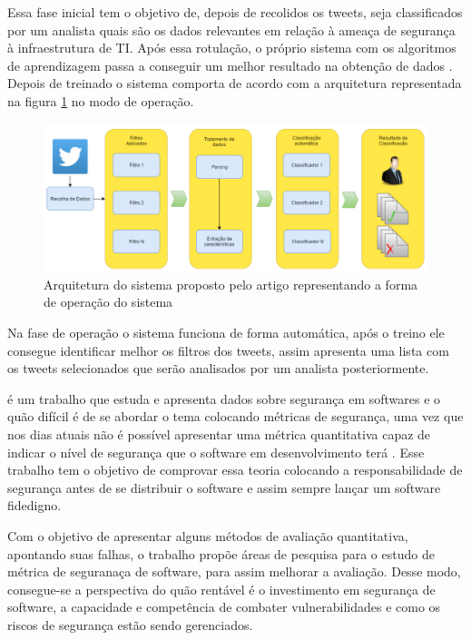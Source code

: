 Essa fase inicial tem o objetivo de, depois de recolidos os tweets, seja classificados por um analista quais são os dados relevantes em relação à ameaça de segurança à infraestrutura de TI. Após essa rotulação, o próprio sistema com os algoritmos de aprendizagem passa a conseguir um melhor resultado na obtenção de dados \cite{Correia2016}. Depois de treinado o sistema comporta de acordo com a arquitetura representada na figura \ref{fig:Correia2} no modo de operação.

\begin{figure}[H]
\centering
\includegraphics[width=1\textwidth]{imagens/Correia2.png}
\caption{Arquitetura do sistema proposto pelo artigo  representando a forma de operação do sistema}
\label{fig:Correia2}
\end{figure}

Na fase de operação o sistema funciona de forma automática, após o treino ele consegue identificar melhor os filtros dos tweets, assim apresenta uma lista com os tweets selecionados que serão analisados por um analista posteriormente.

 é um trabalho que estuda e apresenta dados sobre segurança em softwares e o quão difícil é de se abordar o tema colocando métricas de segurança, uma vez que nos dias atuais não é possível apresentar uma métrica quantitativa capaz de indicar o nível de segurança que o software em desenvolvimento terá \cite{ALVESBATISTA2007}. Esse trabalho tem o objetivo de comprovar essa teoria colocando a responsabilidade de segurança antes de se distribuir o software e assim sempre lançar um software fidedigno.

Com o objetivo de apresentar alguns métodos de avaliação quantitativa, apontando suas falhas, o trabalho propõe áreas de pesquisa para o estudo de métrica de seguranaça de software, para assim melhorar a avaliação. Desse modo, consegue-se a perspectiva do quão rentável é o investimento em segurança de software, a capacidade e competência de combater vulnerabilidades e como os riscos de segurança estão sendo gerenciados.

